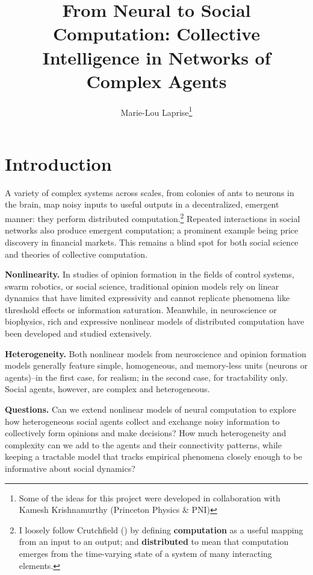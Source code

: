 \documentclass[]{article}
\title{From Neural to Social Computation: Collective Intelligence in Networks of Complex Agents}
\author{Marie-Lou Laprise\footnote{Some of the ideas for this project were developed in collaboration with Kamesh Krishnamurthy (Princeton Physics \& PNI)}}
\begin{document}
	
	\maketitle

\section{Introduction}


A variety of complex systems across scales, from colonies of ants to neurons in the brain, map noisy inputs to useful outputs in a decentralized, emergent manner: they perform distributed computation.\footnote{ I loosely follow Crutchfield (\cite{crutchfieldCalculiEmergenceComputation1994}) by defining \textbf{computation} as a useful mapping from an input to an output; and \textbf{distributed} to mean that computation emerges from the time-varying state of a system of many interacting elements.} Repeated interactions in social networks also produce emergent computation; a prominent example being price discovery in financial markets. This remains a blind spot for both social science and theories of collective computation. 

\textbf{Nonlinearity.} In studies of opinion formation in the fields of control systems, swarm robotics, or social science, traditional opinion models rely on linear dynamics that have limited expressivity and cannot replicate phenomena like threshold effects or information saturation. Meanwhile, in neuroscience or biophysics, rich and expressive nonlinear models of distributed computation have been developed and studied extensively.

\textbf{Heterogeneity.} Both nonlinear models from neuroscience and opinion formation models generally feature simple, homogeneous, and memory-less units (neurons or agents)--in the first case, for realism; in the second case, for tractability only. Social agents, however, are complex and heterogeneous. 

\textbf{Questions.} Can we extend nonlinear models of neural computation to explore how heterogeneous social agents collect and exchange noisy information to collectively form opinions and make decisions? How much heterogeneity and complexity can we add to the agents and their connectivity patterns, while keeping a tractable model that tracks empirical phenomena closely enough to be informative about social dynamics?
\end{document}
